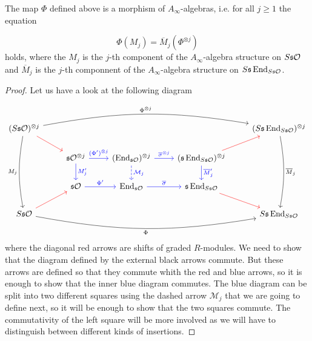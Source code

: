 \documentclass[join.tex]{subfiles}
\begin{document}
\begin{thm}\label{theorem}
The map $\Phi$ defined above is a morphism of $A_\infty$-algebras, i.e. for all $j\geq 1$ the equation

\[\Phi(M_j)=\overline{M}_j(\Phi^{\otimes j})\]
holds, where the $M_j$ is the $j$-th component of the $A_\infty$-algebra structure on $S\mathfrak{s}{\mathcal O}$ and $\overline{M}_j$ is the $j$-th componnent of the $A_\infty$-algebra structure on $S\mathfrak{s}\operatorname{End}_{S\mathfrak{s}{\mathcal O}}$. 
\end{thm}
\begin{proof}
Let us have a look at the following diagram



\[
\begin{tikzcd}
(S\s\OO)^{\otimes j}\arrow[dr,red] \arrow[ddd, bend right=10,"M_j"']\arrow[rrrr,bend left=10, "\Phi^{\otimes j}"]& & & & (S\s\End_{S\s\OO})^{\otimes j}\arrow[ddd, bend left=10, "\overline{M}_j"]\\
&\s\OO^{\otimes j}\arrow[r,blue, "(\Phi')^{\otimes j}"]\arrow[d, blue, "M'_j"] & (\End_{\s\OO})^{\otimes j}\arrow[r, blue,"\overline{\sigma}^{\otimes j}"] \arrow[d, dashed, "\mathcal{M}_j",blue]& (\s\End_{S\s\OO})^{\otimes j}\arrow[ur,red]\arrow[d, "\overline{M}'_j",blue]& \\
&\s\OO\arrow[r, blue, "\Phi'"]& \End_{\s\OO} \arrow[r, blue, "\overline{\sigma}"] & \s\End_{S\s\OO}\arrow[dr,red]& \\
S\s\OO\arrow[rrrr, bend right=10, "\Phi"']\arrow[ur,red]& & & & S\s\End_{S\s\OO}
\end{tikzcd}
\]
where the diagonal red arrows are shifts of graded $R$-modules. We need to show that the diagram defined by the external black arrows commute. But these arrows are defined so that they commute whith the red and blue arrows, so it is enough to show that the inner blue diagram commutes. The blue diagram can be split into two different squares using the dashed arrow $\mathcal{M}_j$ that we are going to define next, so it will be enough to show that the two squares commute. The commutativity of the  left square will be more involved as we will have to distinguish between different kinds of insertions.


\end{proof}
\end{document}
